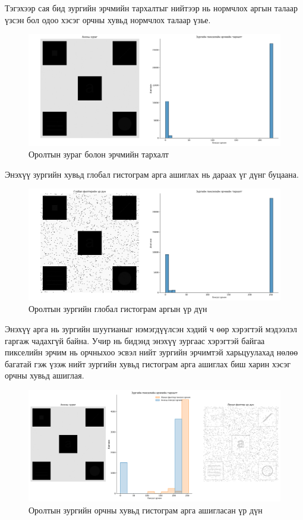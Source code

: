 \documentclass[a4paper]{article}
\begin{document}
Тэгэхээр сая бид зургийн эрчмийн тархалтыг нийтээр нь нормчлох аргын талаар үзсэн бол одоо хэсэг орчны хувьд нормчлох талаар үзье.
\begin{figure}[H]
  \centering
  \includegraphics[scale = 0.30]{og_image.png}
  \caption[Intensity 1]{Оролтын зураг болон эрчмийн тархалт}
\end{figure}
Энэхүү зургийн хувьд глобал гистограм арга ашиглах нь дараах үг дүнг буцаана.
\begin{figure}[H]
  \centering
  \includegraphics[scale = 0.30]{global_eq.png}
  \caption[Intensity 1]{Оролтын зургийн глобал гистограм аргын үр дүн}
\end{figure}
Энэхүү арга нь зургийн шуугианыг нэмэгдүүлсэн хэдий ч өөр хэрэгтэй мэдээлэл гаргаж чадахгүй байна. Учир нь бидэнд энэхүү зургаас хэрэгтэй байгаа пикселийн эрчим нь орчныхоо эсвэл нийт зургийн эрчимтэй харьцуулахад нөлөө багатай гэж үзэж нийт зургийн хувьд гистограм арга ашиглах биш харин хэсэг орчны хувьд ашиглая.
\begin{figure}[H]
  \centering
  \includegraphics[scale = 0.30]{local_eq_1.png}
  \caption[Intensity 1]{Оролтын зургийн орчны хувьд гистограм арга ашигласан үр дүн}
\end{figure}
\end{document}
